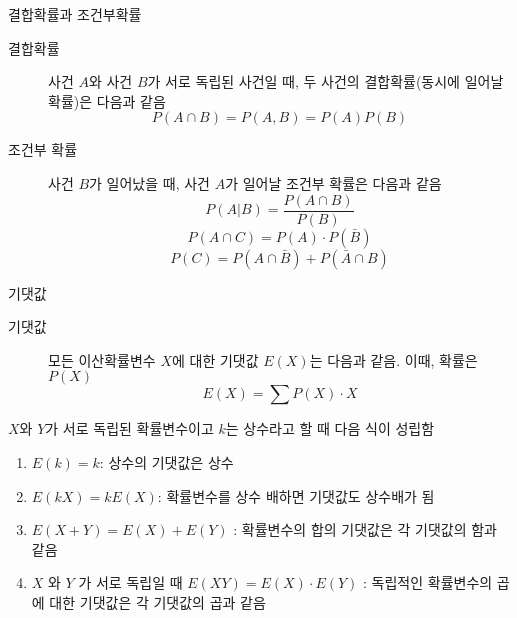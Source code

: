 \documentclass[10pt,t]{beamer}
\begin{document}
\begin{frame}[fragile] {결합확률과 조건부확률}
    \begin{description}
        \item[결합확률] 사건 $A$와 사건 $B$가 서로 독립된 사건일 때, 두 사건의 결합확률(동시에 일어날 확률)은 다음과 같음 \[P(A\cap B)= P(A, B) = P(A)P(B)\]
        \item[조건부 확률] 사건 $B$가 일어났을 때, 사건 $A$가 일어날 조건부 확률은 다음과 같음 \[P(A|B)=\frac{P(A\cap B)}{P(B)}\]
        \[P(A\cap C) = P(A) \cdot P(\bar{B})\]\[P(C) = P(A\cap \bar{B})+P(\bar{A} \cap B)\]
    \end{description}
\end{frame}



\begin{frame}[fragile] {기댓값}
    \begin{description}
        \item[기댓값] 모든 이산확률변수 $X$에 대한 기댓값 $E(X)$는 다음과 같음. 이때, 확률은 $P(X)$ \[E(X)=\sum P(X)\cdot X \]
    \end{description}

    $X$와 $Y$가 서로 독립된 확률변수이고 $k$는 상수라고 할 때 다음 식이 성립함
    \begin{enumerate}
        \item $E(k) = k$: 상수의 기댓값은 상수
        \item $E(kX) = kE(X)$: 확률변수를 상수 배하면 기댓값도 상수배가 됨
        \item $E(X+Y) = E(X) + E(Y)$ : 확률변수의 합의 기댓값은 각 기댓값의 함과 같음
        \item $X$ 와 $Y$ 가 서로 독립일 때 $E(XY) = E(X) \cdot E(Y)$ : 독립적인 확률변수의 곱에 대한 기댓값은 각 기댓값의 곱과 같음
    \end{enumerate}
\end{frame}
\end{document}
